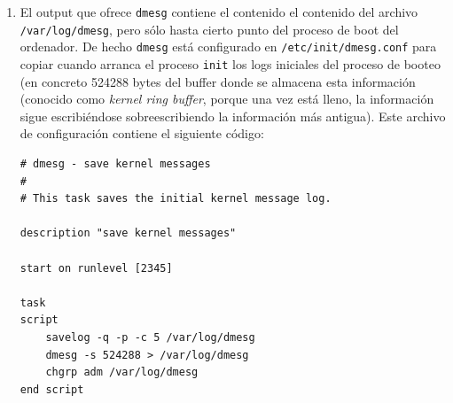\documentclass[a4paper,10pt]{article}
\newenvironment{answer}{%
\begin{list}{}{%
}%
\item[]}{\end{list}}
\begin{document}
\begin{answer}
\begin{enumerate}
   Por tanto las líneas obtenidas han sido:
  \begin{lstlisting}[style=BashInputStyle,basicstyle=\footnotesize\ttfamily]
[  125.859239] usb 1-1: USB disconnect, device number 2
[  127.720081] usb 1-1: new high-speed USB device number 3 using ehci-pci
[  127.880837] usb 1-1: New USB device found, idVendor=8564, idProduct=1000
[  127.880841] usb 1-1: New USB device strings: Mfr=1, Product=2, SerialNumber=3
[  127.880843] usb 1-1: Product: Mass Storage Device
[  127.880845] usb 1-1: Manufacturer: JetFlash
[  127.880846] usb 1-1: SerialNumber: XZCAS49T
[  127.883114] usb-storage 1-1:1.0: USB Mass Storage device detected
[  127.883226] scsi6 : usb-storage 1-1:1.0
[  128.887776] scsi 6:0:0:0: Direct-Access     JetFlash Transcend 2GB    8.07 PQ: 0 ANSI: 2
[  128.887988] sd 6:0:0:0: Attached scsi generic sg4 type 0
[  128.912840] sd 6:0:0:0: [sdd] 3948544 512-byte logical blocks: (2.02 GB/1.88 GiB)
[  128.919565] sd 6:0:0:0: [sdd] Write Protect is off
[  128.919570] sd 6:0:0:0: [sdd] Mode Sense: 03 00 00 00
[  128.926431] sd 6:0:0:0: [sdd] No Caching mode page found
[  128.926564] sd 6:0:0:0: [sdd] Assuming drive cache: write through
[  129.422893]  sdd: sdd1
[  129.461971] sd 6:0:0:0: [sdd] Attached SCSI removable disk
  \end{lstlisting}
\item 
El output que ofrece \texttt{dmesg} contiene el contenido el contenido del archivo \texttt{/var/log/dmesg}, pero
sólo hasta cierto punto del proceso de boot del ordenador. De hecho \texttt{dmesg} está configurado en \texttt{/etc/init/dmesg.conf}
para copiar cuando arranca el proceso \texttt{init} los logs iniciales del proceso de booteo (en concreto 524288 bytes del
buffer donde se almacena esta información (conocido como \textit{kernel ring buffer}, porque una vez está lleno, la información
sigue escribiéndose sobreescribiendo la información más antigua). Este archivo de configuración contiene el siguiente código:

\begin{lstlisting}[style=BashInputStyle]
# dmesg - save kernel messages
#
# This task saves the initial kernel message log.

description	"save kernel messages"

start on runlevel [2345]

task
script
    savelog -q -p -c 5 /var/log/dmesg
    dmesg -s 524288 > /var/log/dmesg
    chgrp adm /var/log/dmesg
end script
\end{lstlisting}


\end{enumerate}
\end{answer}
\end{document}

